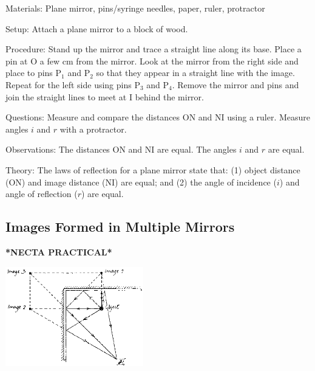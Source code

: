 \begin{multicols}{2}
\begin{description*}
\item[Materials:]{Plane mirror, pins/syringe needles, paper, ruler, protractor}
\item[Setup:]{Attach a plane mirror to a block of wood.}
\item[Procedure:]{Stand up the mirror and trace a straight line along its base. Place a pin at O a few cm from the mirror. Look at the mirror from the right side and place to pins P$_1$ and P$_2$ so that they appear in a straight line with the image. Repeat for the left side using pins P$_3$ and P$_4$. Remove the mirror and pins and join the straight lines to meet at I behind the mirror.}
\item[Questions:]{Measure and compare the distances ON and NI using a ruler. Measure angles $i$ and $r$ with a protractor.}
\item[Observations:]{The distances ON and NI are equal. The angles $i$ and $r$ are equal.}
\item[Theory:]{The laws of reflection for a plane mirror state that: (1) object distance (ON) and image distance (NI) are equal; and (2) the angle of incidence ($i$) and angle of reflection ($r$) are equal.}
\end{description*}

\subsection{Images Formed in Multiple Mirrors}
\textbf{*NECTA PRACTICAL*}

\begin{center}
\includegraphics[width=0.45\textwidth]{./img/source/multiple-mirrors.png}
\end{center}


\end{multicols}
